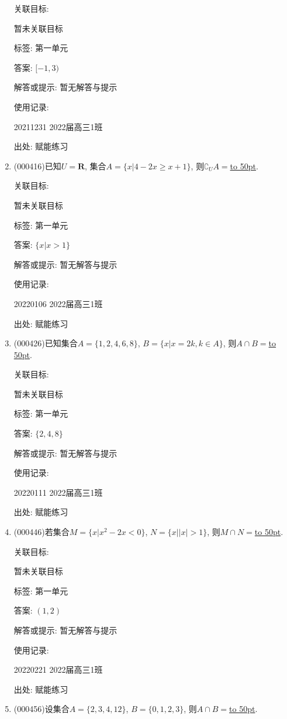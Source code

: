 \documentclass[10pt,a4paper]{article}
\newcommand{\blank}[1]{\underline{\hbox to #1pt{}}}
\begin{document}
\begin{enumerate}[1.]
关联目标:

暂未关联目标



标签: 第一单元

答案: $[-1,3)$

解答或提示: 暂无解答与提示

使用记录:

20211231	2022届高三1班	


出处: 赋能练习
\item { (000416)}已知$U=\mathbf{R}$, 集合$A=\{x|4-2x\ge x+1\}$, 则${\complement_U}A=$\blank{50}.


关联目标:

暂未关联目标



标签: 第一单元

答案: $\{x|x>1\}$

解答或提示: 暂无解答与提示

使用记录:

20220106	2022届高三1班	


出处: 赋能练习
\item { (000426)}已知集合$A=\{1,2,4,6,8\}$, $B=\{x|x=2k,k\in A\}$, 则$A\cap B=$\blank{50}.


关联目标:

暂未关联目标



标签: 第一单元

答案: $\{2,4,8\}$

解答或提示: 暂无解答与提示

使用记录:

20220111	2022届高三1班	


出处: 赋能练习
\item { (000446)}若集合$M=\{x|{x^2}-2x<0\}$, $N=\{x||x|>1\}$, 则$M\cap N=$\blank{50}.


关联目标:

暂未关联目标



标签: 第一单元

答案: $(1,2)$

解答或提示: 暂无解答与提示

使用记录:

20220221	2022届高三1班	


出处: 赋能练习
\item { (000456)}设集合$A=\{2,3,4,12\}$, $B=\{0,1,2,3\}$, 则$A\cap B=$\blank{50}.



\end{enumerate}
\end{document}
